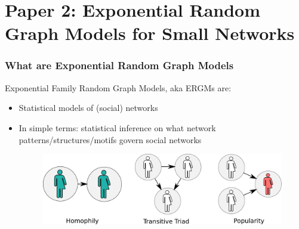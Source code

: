 \documentclass[aspectratio=169, 9pt]{beamer}
\begin{document}
\section{Paper 2: Exponential Random Graph Models for Small Networks}


\begin{frame}
\frametitle{What are Exponential Random Graph Models}

Exponential Family Random Graph Models, aka \alert{ERGMs} are:\pause

\begin{itemize}[<+->]
\item Statistical models of (social) networks
\item In simple terms: statistical inference on what network patterns/structures/motifs
govern social networks
\begin{figure}
\includegraphics[width=.6\linewidth]{friendly-terms.pdf}
\end{figure}
\end{itemize}

\end{frame}
\end{document}
